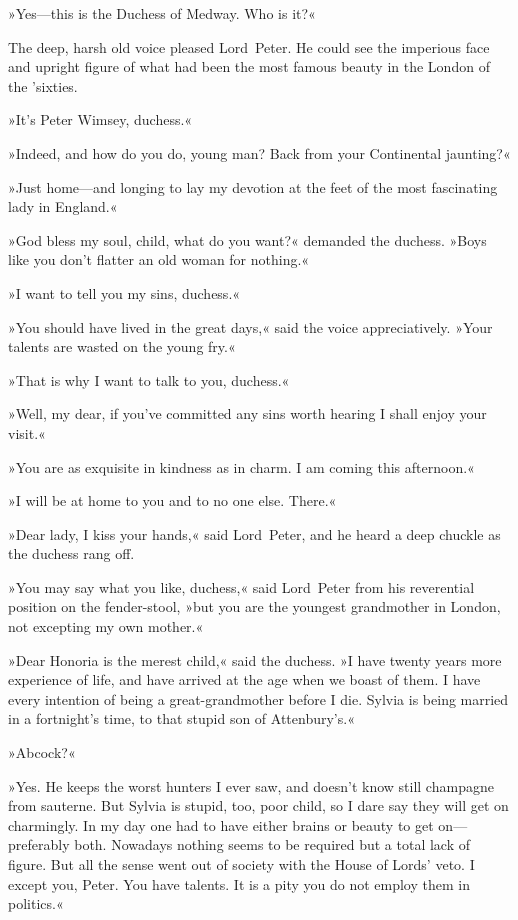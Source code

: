 »Yes—this is the Duchess of Medway. Who is it?«

The deep, harsh old voice pleased Lord~Peter. He could see the imperious face and upright figure of what had been the most famous beauty in the London of the 'sixties.

»It's Peter Wimsey, duchess.«

»Indeed, and how do you do, young man? Back from your Continental jaunting?«

»Just home—and longing to lay my devotion at the feet of the most fascinating lady in England.«

»God bless my soul, child, what do you want?« demanded the duchess. »Boys like you don't flatter an old woman for nothing.«

»I want to tell you my sins, duchess.«

»You should have lived in the great days,« said the voice appreciatively. »Your talents are wasted on the young fry.«

»That is why I want to talk to you, duchess.«

»Well, my dear, if you've committed any sins worth hearing I shall enjoy your visit.«

»You are as exquisite in kindness as in charm. I am coming this afternoon.«

»I will be at home to you and to no one else. There.«

»Dear lady, I kiss your hands,« said Lord~Peter, and he heard a deep chuckle as the duchess rang off.

\divider
»You may say what you like, duchess,« said Lord~Peter from his reverential position on the fender-stool, »but you are the youngest grandmother in London, not excepting my own mother.«

»Dear Honoria is the merest child,« said the duchess. »I have twenty years more experience of life, and have arrived at the age when we boast of them. I have every intention of being a great-grandmother before I die. Sylvia is being married in a fortnight's time, to that stupid son of Attenbury's.«

»Abcock?«

»Yes. He keeps the worst hunters I ever saw, and doesn't know still champagne from sauterne. But Sylvia is stupid, too, poor child, so I dare say they will get on charmingly. In my day one had to have either brains or beauty to get on—preferably both. Nowadays nothing seems to be required but a total lack of figure. But all the sense went out of society with the House of Lords' veto. I except you, Peter. You have talents. It is a pity you do not employ them in politics.«

